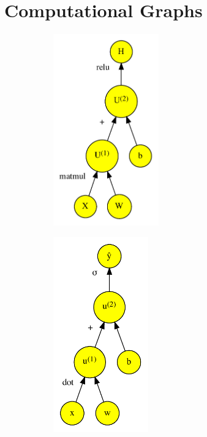 \documentclass[handout]{beamer}
\begin{document}
\section{Computational Graphs}
\begin{frame}
    \begin{figure}
        \centering
        \begin{minipage}{0.45\textwidth}
            \begin{figure}[]
                \centering
                \includegraphics[width=0.5\textwidth]{../plots/computational-graph-c-crop.pdf}
            \end{figure}
        \end{minipage}\hfill
        \begin{minipage}{0.45\textwidth}
            \centering
            \begin{figure}[]
                \includegraphics[width=0.45\textwidth]{../plots/computational-graph-b-crop.pdf}

\end{figure}
\end{minipage}
\end{figure}
\end{frame}
\end{document}
